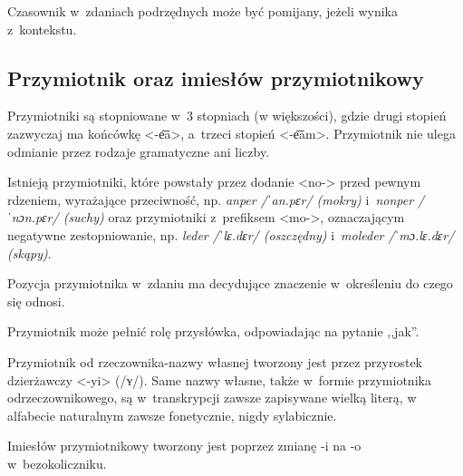 \begin{spacing}{1.1}

Czasownik w~zdaniach podrzędnych może być pomijany, jeżeli wynika z~kontekstu.


\subsection{Przymiotnik oraz imiesłów przymiotnikowy}

Przymiotniki są stopniowane w~3 stopniach (w większości), gdzie drugi stopień
zazwyczaj ma końcówkę <-e͞a>, a~trzeci stopień <-e͞am>. Przymiotnik nie ulega
odmianie przez rodzaje gramatyczne ani liczby.

Istnieją przymiotniki, które powstały przez dodanie <no-> przed pewnym rdzeniem,
wyrażające przeciwność, np. \emph{anper /ˈan.pɛr/ (mokry)} i~\emph{nonper
/ˈnɔn.pɛr/ (suchy)} oraz przymiotniki z~prefiksem <mo->, oznaczającym negatywne
zestopniowanie, np. \emph{leder /ˈlɛ.dɛr/ (oszczędny)} i~\emph{moleder
/ˈmɔ.lɛ.dɛr/ (skąpy)}.

Pozycja przymiotnika w~zdaniu ma decydujące znaczenie w~określeniu do czego się
odnosi.





Przymiotnik może pełnić rolę przysłówka, odpowiadając na pytanie ,,jak''.


Przymiotnik od rzeczownika-nazwy własnej tworzony jest przez przyrostek
dzierżawczy <-yi> (/ʏ/). Same nazwy własne, także w~formie przymiotnika
odrzeczownikowego, są w~transkrypcji zawsze zapisywane wielką literą, w~
alfabecie naturalnym zawsze fonetycznie, nigdy sylabicznie.

Imiesłów przymiotnikowy tworzony jest poprzez zmianę -i na -o w~bezokoliczniku.


\end{spacing}
